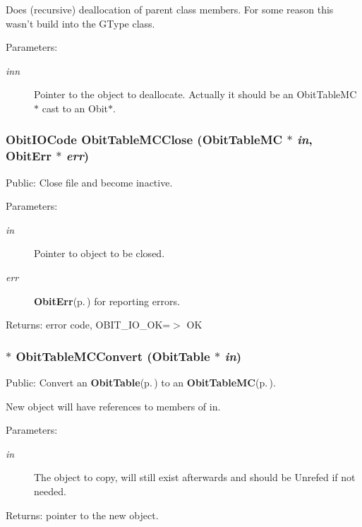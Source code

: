 Does (recursive) deallocation of parent class members. For some reason this wasn't build into the GType class. \begin{Desc}
\item[Parameters:]
\begin{description}
\item[{\em inn}]Pointer to the object to deallocate. Actually it should be an Obit\-Table\-MC$\ast$ cast to an Obit$\ast$. \end{description}
\end{Desc}
\subsubsection{\setlength{\rightskip}{0pt plus 5cm}Obit\-IOCode Obit\-Table\-MCClose ({\bf Obit\-Table\-MC} $\ast$ {\em in}, {\bf Obit\-Err} $\ast$ {\em err})}\label{ObitTableMC_8c_a25}


Public: Close file and become inactive. 

\begin{Desc}
\item[Parameters:]
\begin{description}
\item[{\em in}]Pointer to object to be closed. \item[{\em err}]{\bf Obit\-Err}{\rm (p.\,\pageref{structObitErr})} for reporting errors. \end{description}
\end{Desc}
\begin{Desc}
\item[Returns:]error code, OBIT\_\-IO\_\-OK=$>$ OK \end{Desc}
\subsubsection{$\ast$ Obit\-Table\-MCConvert ({\bf Obit\-Table} $\ast$ {\em in})}\label{ObitTableMC_8c_a19}


Public: Convert an {\bf Obit\-Table}{\rm (p.\,\pageref{structObitTable})} to an {\bf Obit\-Table\-MC}{\rm (p.\,\pageref{structObitTableMC})}. 

New object will have references to members of in. \begin{Desc}
\item[Parameters:]
\begin{description}
\item[{\em in}]The object to copy, will still exist afterwards and should be Unrefed if not needed. \end{description}
\end{Desc}
\begin{Desc}
\item[Returns:]pointer to the new object. \end{Desc}
